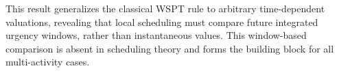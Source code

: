 \documentclass[letterpaper]{article}
\begin{document}
This result generalizes the classical WSPT rule to arbitrary time-dependent
valuations, revealing that local scheduling must compare future integrated
urgency windows, rather than instantaneous values. This window-based
comparison is absent in scheduling theory and forms the
building block for all multi-activity cases.




\end{document}
